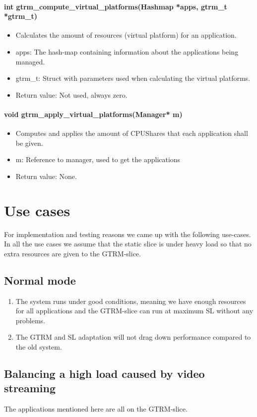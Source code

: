 \documentclass[nobiblatex]{LTHthesis}
\begin{document}
\subsubsection{int gtrm\_compute\_virtual\_platforms(Hashmap *apps, gtrm\_t *gtrm\_t)}
\begin{itemize}
\item Calculates the amount of resources (virtual platform) for an application.
\item apps: The hash-map containing information about the applications being managed.
\item gtrm\_t: Struct with parameters used when calculating the virtual platforms.
\item Return value: Not used, always zero.
\end{itemize}

\subsubsection{void gtrm\_apply\_virtual\_platforms(Manager* m)}
\begin{itemize}
\item Computes and applies the amount of CPUShares that each application shall be given.
\item m: Reference to manager, used to get the applications
\item Return value: None.
\end{itemize}

\chapter{Use cases}
For implementation and testing reasons we came up with the following use-cases. In all the use cases we assume that the static slice is under heavy load so that no extra resources are given to the GTRM-slice. 
\section{Normal mode}
\begin{enumerate}
\item The system runs under good conditions, meaning we have enough resources for all applications and the GTRM-slice can run at maximum SL without any problems.
\item The GTRM and SL adaptation will not drag down performance compared to the old system.
\end{enumerate}
\section{Balancing a high load caused by video streaming}
The applications mentioned here are all on the GTRM-slice.
\end{document}
